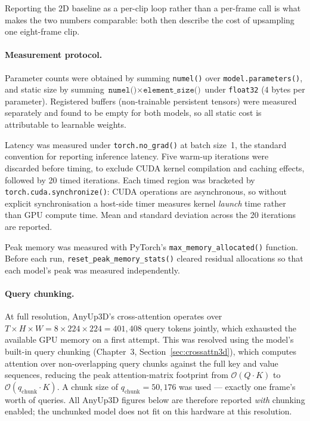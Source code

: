 Reporting the 2D baseline as a per-clip loop rather than a per-frame call is what makes the two numbers comparable: both then describe the cost of upsampling one eight-frame clip.

\paragraph{Measurement protocol.}
Parameter counts were obtained by summing \texttt{numel()} over \texttt{model.parameters()}, and static size by summing $\texttt{numel()} \times \texttt{element\_size()}$ under \texttt{float32} ($4$ bytes per parameter).
Registered buffers (non-trainable persistent tensors) were measured separately and found to be empty for both models, so all static cost is attributable to learnable weights.

Latency was measured under \texttt{torch.no\_grad()} at batch size~1, the standard convention for reporting inference latency.
Five warm-up iterations were discarded before timing, to exclude CUDA kernel compilation and caching effects, followed by 20 timed iterations.
Each timed region was bracketed by \texttt{torch.cuda.synchronize()}: CUDA operations are asynchronous, so without explicit synchronisation a host-side timer measures kernel \emph{launch} time rather than GPU compute time.
Mean and standard deviation across the 20 iterations are reported.

Peak memory was measured with PyTorch's \texttt{max\_memory\_allocated()} function.
Before each run, \texttt{reset\_peak\_memory\_stats()} cleared residual allocations so that each model's peak was measured independently.

\paragraph{Query chunking.}
At full resolution, AnyUp3D's cross-attention operates over $T \times H \times W = 8 \times 224 \times 224 = 401{,}408$ query tokens jointly, which exhausted the available GPU memory on a first attempt.
This was resolved using the model's built-in query chunking (Chapter~3, Section~\ref{sec:crossattn3d}), which computes attention over non-overlapping query chunks against the full key and value sequences, reducing the peak attention-matrix footprint from $\mathcal{O}(Q \cdot K)$ to $\mathcal{O}(q_{\text{chunk}} \cdot K)$.
A chunk size of $q_{\text{chunk}} = 50{,}176$ was used --- exactly one frame's worth of queries.
All AnyUp3D figures below are therefore reported \emph{with} chunking enabled; the unchunked model does not fit on this hardware at this resolution.

